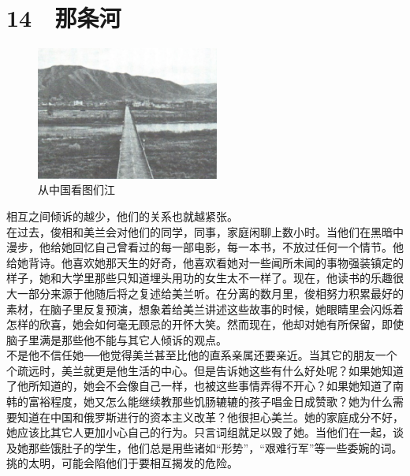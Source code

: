 \fancyhead[RO]{\thepage}
\fancyhead[LE]{\thepage}
\fancyfoot[LE,RO]{}
\fancyfoot[LO,CE]{}
\fancyfoot[CO,RE]{}
\chapter*{14 {\FA } 那条河}
\begin{figure}[!htbp]
\centering
\includegraphics[width=6cm]{./Chapters/Images/14.jpg}
\caption*{从中国看图们江}
\end{figure}


相互之间倾诉的越少，他们的关系也就越紧张。\\

在过去，俊相和美兰会对他们的同学，同事，家庭闲聊上数小时。当他们在黑暗中漫步，他给她回忆自己曾看过的每一部电影，每一本书，不放过任何一个情节。他给她背诗。他喜欢她那天生的好奇，他喜欢看她对一些闻所未闻的事物强装镇定的样子，她和大学里那些只知道埋头用功的女生太不一样了。现在，他读书的乐趣很大一部分来源于他随后将之复述给美兰听。在分离的数月里，俊相努力积累最好的素材，在脑子里反复预演，想象着给美兰讲述这些故事的时候，她眼睛里会闪烁着怎样的欣喜，她会如何毫无顾忌的开怀大笑。然而现在，他却对她有所保留，即使脑子里满是那些他不能与其它人倾诉的观点。\\

不是他不信任她──他觉得美兰甚至比他的直系亲属还要亲近。当其它的朋友一个个疏远时，美兰就更是他生活的中心。但是告诉她这些有什么好处呢？如果她知道了他所知道的，她会不会像自己一样，也被这些事情弄得不开心？如果她知道了南韩的富裕程度，她又怎么能继续教那些饥肠辘辘的孩子唱金日成赞歌？她为什么需要知道在中国和俄罗斯进行的资本主义改革？他很担心美兰。她的家庭成分不好，她应该比其它人更加小心自己的行为。只言词组就足以毁了她。当他们在一起，谈及她那些饿肚子的学生，他们总是用些诸如“形势”，“艰难行军”等一些委婉的词。挑的太明，可能会陷他们于要相互揭发的危险。\\

